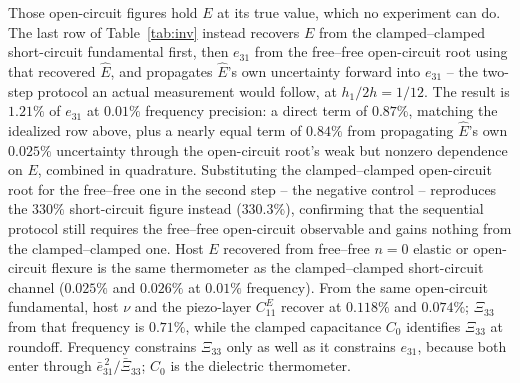 \documentclass[11pt]{article}
\newcommand{\eebar}{\bar{e}_{31}}
\newcommand{\Xibar}{\bar{\Xi}_{33}}
\begin{document}
Those open-circuit figures hold $E$ at its true value, which no
experiment can do. The last row of Table~\ref{tab:inv} instead recovers
$E$ from the clamped--clamped short-circuit fundamental first, then
$e_{31}$ from the free--free open-circuit root using that recovered
$\hat E$, and propagates $\hat E$'s own uncertainty forward into
$e_{31}$ -- the two-step protocol an actual measurement would follow, at
$h_1/2h=1/12$. The result is $1.21\%$ of $e_{31}$ at $0.01\%$ frequency
precision: a direct term of $0.87\%$, matching the idealized row above,
plus a nearly equal term of $0.84\%$ from propagating $\hat E$'s
own $0.025\%$ uncertainty through the open-circuit root's weak but
nonzero dependence on $E$, combined in quadrature. Substituting the
clamped--clamped open-circuit
root for the free--free one in the second step -- the negative
control -- reproduces the $330\%$ short-circuit figure instead
($330.3\%$), confirming that the sequential protocol still requires the
free--free open-circuit observable and gains nothing from the
clamped--clamped one.
Host $E$ recovered from free--free $n=0$ elastic or open-circuit
flexure is the same thermometer as the clamped--clamped short-circuit
channel ($0.025\%$ and $0.026\%$ at $0.01\%$ frequency). From
the same open-circuit fundamental, host $\nu$ and the piezo-layer
$C_{11}^E$ recover at $0.118\%$ and $0.074\%$; $\Xi_{33}$ from that
frequency is $0.71\%$, while the clamped capacitance $C_0$ identifies
$\Xi_{33}$ at roundoff. Frequency constrains $\Xi_{33}$ only as well as
it constrains $e_{31}$, because both enter through $\eebar^{\,2}/\Xibar$;
$C_0$ is the dielectric thermometer.
\end{document}
